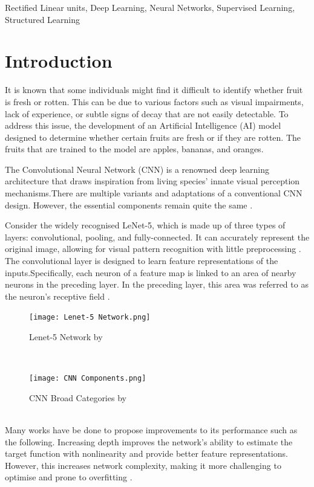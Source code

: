\documentclass[conference]{IEEEtran}
\begin{document}
\begin{IEEEkeywords}
Rectified Linear units, Deep Learning,
Neural Networks, Supervised Learning, Structured Learning
\end{IEEEkeywords}

\section{Introduction}

It is known that some individuals might find it difficult to identify whether fruit is fresh or rotten. This can be due to various factors such as visual impairments, lack of experience, or subtle signs of decay that are not easily detectable. To address this issue, the development of an Artificial Intelligence (AI) model designed to determine whether certain fruits are fresh or if they are rotten. The fruits that are trained to the model are apples, bananas, and oranges.

The Convolutional Neural Network (CNN) is a renowned deep learning architecture that draws inspiration from living species' innate visual perception mechanisms.There are multiple variants and adaptations of a conventional CNN design. However, the essential components remain quite the same \cite{b6}.

Consider the widely recognised LeNet-5, which is made up of three types of layers: convolutional, pooling, and fully-connected. It can accurately represent the original image, allowing for visual pattern recognition with little preprocessing \cite{b6}.
\\
The convolutional layer is designed to learn feature representations of the inputs.Specifically, each neuron of a feature map is linked to an area of nearby neurons in the preceding layer. In the preceding layer, this area was referred to as the neuron's receptive field \cite{b6}.
\\
\begin{figure}[h]
    \centering
    \texttt{[image: Lenet-5 Network.png]}
    \caption{Lenet-5 Network by }
    \label{fig}
\end{figure}
\\
\begin{figure}[h]
    \centering
    \texttt{[image: CNN Components.png]}
    \caption{CNN Broad Categories by}
    \label{fig}
\end{figure}
\\
Many works have be done to propose improvements to its performance such as the following.
Increasing depth improves the network's ability to estimate the target function with nonlinearity and provide better feature representations. However, this increases network complexity, making it more challenging to optimise and prone to overfitting \cite{b6}.
\end{document}
